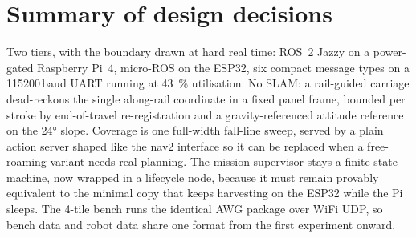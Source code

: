 \documentclass[11pt,a4paper]{article}
\begin{document}
\section{Summary of design decisions}
Two tiers, with the boundary drawn at hard real time: ROS~2 Jazzy on a power-gated
Raspberry Pi~4, micro-ROS on the ESP32, six compact message types on a
\num{115200}\,baud UART running at \SI{43}{\percent} utilisation. No SLAM: a
rail-guided carriage dead-reckons the single along-rail coordinate in a fixed panel
frame, bounded per stroke by end-of-travel re-registration and a gravity-referenced
attitude reference on the \ang{24} slope. Coverage is one full-width fall-line sweep,
served by a plain action server shaped like the nav2 interface so it can be replaced
when a free-roaming variant needs real planning. The mission supervisor stays a finite-state machine, now wrapped in
a lifecycle node, because it must remain provably equivalent to the minimal
copy that keeps harvesting on the ESP32 while the Pi sleeps. The 4-tile bench runs
the identical AWG package over WiFi UDP, so bench data and robot data share one
format from the first experiment onward.



\end{document}
